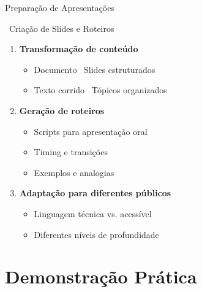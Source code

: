 \documentclass[aspectratio=169,12pt]{beamer}
\begin{document}
\begin{frame}{Preparação de Apresentações}
    \begin{block}{\faChalkboardTeacher \, Criação de Slides e Roteiros}
        \begin{enumerate}
            \item \textbf{Transformação de conteúdo}
                \begin{itemize}
                    \item Documento \faArrowRight\, Slides estruturados
                    \item Texto corrido \faArrowRight\, Tópicos organizados
                \end{itemize}
                
            \item \textbf{Geração de roteiros}
                \begin{itemize}
                    \item Scripts para apresentação oral
                    \item Timing e transições
                    \item Exemplos e analogias
                \end{itemize}
            \item \textbf{Adaptação para diferentes públicos}
                \begin{itemize}
                    \item Linguagem técnica vs. acessível
                    \item Diferentes níveis de profundidade
                \end{itemize}
        \end{enumerate}
    \end{block}
\end{frame}


\section{Demonstração Prática}
\end{document}

